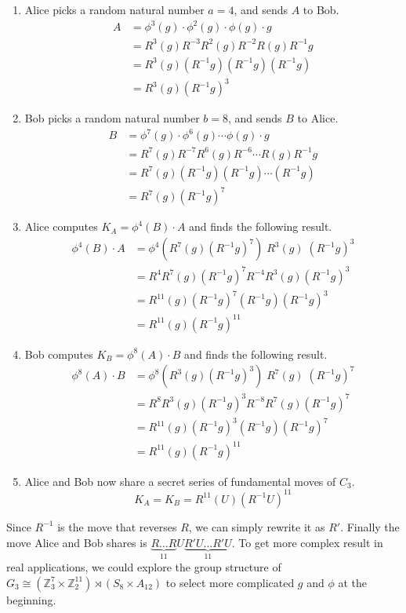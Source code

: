 \begin{enumerate}
    \item Alice picks a random natural number $a = 4$, and sends $A$ to Bob.
    \begin{align*}
        A & = \phi^3(g) \cdot \phi^2(g) \cdot \phi(g) \cdot g \\
        & = R^3(g)R^{-3}R^2(g)R^{-2}R(g)R^{-1}g \\
        & = R^3(g)(R^{-1}g)(R^{-1}g)(R^{-1}g) \\
        & = R^3(g)(R^{-1}g)^3
    \end{align*}
    \item Bob picks a random natural number $b = 8$, and sends $B$ to Alice.
    \begin{align*}
        B & = \phi^7(g) \cdot \phi^6(g) \cdots \phi(g) \cdot g \\
        & = R^7(g)R^{-7}R^6(g)R^{-6} \cdots R(g)R^{-1}g \\
        & = R^7(g)(R^{-1}g)(R^{-1}g) \cdots (R^{-1}g) \\
        & = R^7(g)(R^{-1}g)^7
    \end{align*}
    \item Alice computes $K_A = \phi^4(B) \cdot A$ and finds the following result.
    \begin{align*}
        \phi^4(B) \cdot A & = \phi^4(R^7(g)(R^{-1}g)^7)\;R^3(g)\;(R^{-1}g)^3 \\
        & = R^4R^7(g)(R^{-1}g)^7R^{-4}R^3(g)(R^{-1}g)^3 \\
        & = R^{11}(g)(R^{-1}g)^7(R^{-1}g)(R^{-1}g)^3 \\
        & = R^{11}(g)(R^{-1}g)^{11}
    \end{align*}
    \item Bob computes $K_B = \phi^8(A) \cdot B$ and finds the following result.
    \begin{align*}
        \phi^8(A) \cdot B & = \phi^8(R^3(g)(R^{-1}g)^3)\;R^7(g)\;(R^{-1}g)^7 \\
        & = R^8R^3(g)(R^{-1}g)^3R^{-8}R^7(g)(R^{-1}g)^7 \\
        & = R^{11}(g)(R^{-1}g)^3(R^{-1}g)(R^{-1}g)^7 \\
        & = R^{11}(g)(R^{-1}g)^{11}
    \end{align*}
    \item Alice and Bob now share a secret series of fundamental moves of $C_3$.
    $$K_A = K_B = R^{11}(U)(R^{-1}U)^{11}$$
\end{enumerate}
Since $R^{-1}$ is the move that reverses $R$, we can simply rewrite it as $R'$. Finally the move Alice and Bob shares is $\underbrace{R...R}_{11}U\underbrace{R'U...R'U}_{11}$. To get more complex result in real applications, we could explore the group structure of $G_3 \cong (\mathbb{Z}_3^7 \times \mathbb{Z}_2^{11}) \rtimes (S_8 \times A_{12})$ to select more complicated $g$ and $\phi$ at the beginning.
